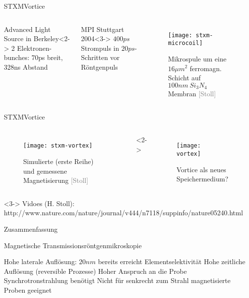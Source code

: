 \begin{frame}{STXM}{Vortice}
	\begin{columns}
			\begin{block}{Advanced Light Source in Berkeley}<2->
				2 Elektronen-bunches: 70ps breit, 328ns Abstand
			\end{block}
			\begin{block}{MPI Stuttgart 2004}<3->
				$400ps$ Strompuls in $20 ps$-Schritten vor Röntgenpuls
			\end{block}
			\begin{figure}[H]
				\begin{center}
					\texttt{[image: stxm-microcoil]}
					\caption{Mikrospule um eine $16\mu m^2$ ferromagn. Schicht auf $100 nm ~ Si_3N_4$ Membran
					\tiny{\textcolor{gray}{[Stoll]}}}
				\end{center}
			\end{figure}	    
	\end{columns}
\end{frame}

\begin{frame}{STXM}{Vortice}
	\setbeamercovered{invisible}
		\begin{columns}
		 	\column{.5\textwidth}
				\begin{figure}[H]
					\begin{center}
						\texttt{[image: stxm-vortex]}
						\caption{Simulierte (erste Reihe) und gemessene Magnetisierung \tiny{\textcolor{gray}{[Stoll]}}}
					\end{center}
				\end{figure}
		    \column{.5\textwidth}<2->
				\begin{figure}[H]
					\begin{center}
						\texttt{[image: vortex]}
						\caption{Vortice als neues Speichermedium?}
					\end{center}
				\end{figure}	    
		\end{columns}
	\begin{block}{}<3->
		\tiny Vidoes (H. Stoll):  http://www.nature.com/nature/journal/v444/n7118/suppinfo/nature05240.html
	\end{block}
\end{frame}

\begin{frame}{Zusammenfassung}{}
	\begin{block}{Magnetische Transmissionsröntgenmikroskopie}
		\begin{itemize}
			\pro Hohe laterale Auflösung: $20nm$ bereits erreicht
			\pro Elementselektivität
			\pro Hohe zeitliche Auflösung (reversible Prozesse)
			\contra Hoher Anspruch an die Probe
			\contra Synchrotronstrahlung benötigt
			\contra Nicht für senkrecht zum Strahl magnetisierte Proben geeignet
		\end{itemize}
	\end{block}
\end{frame}


